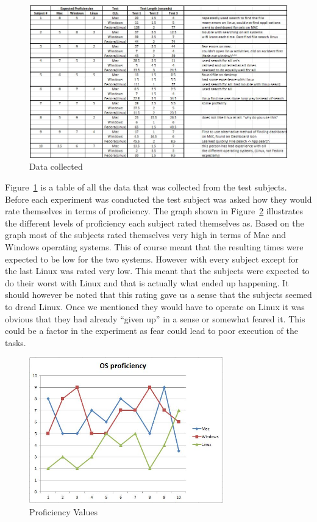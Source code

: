 \documentclass[11pt]{article}
\begin{document}
\begin{figure}[h!]
  \centering
    \includegraphics[width= 1\textwidth]{./Images/Data_table}
  \caption{Data collected}
 \label{Collect}
\end{figure}


Figure~\ref{Collect} is a table of all the data that was collected from the test subjects. Before each experiment was conducted the test subject was asked how they would rate themselves in terms of proficiency. The graph shown in Figure~\ref{Proficiency} illustrates the different levels of proficiency each subject rated themselves as. Based on the graph most of the subjects rated themselves very high in terms of Mac and Windows operating systems. This of course meant that the resulting times were expected to be low for the two systems. However with every subject except for the last Linux was rated very low. This meant that the subjects were expected to do their worst with Linux and that is actually what ended up happening. It should however be noted that this rating gave us a sense that the subjects seemed to dread Linux. Once we mentioned they would have to operate on Linux it was obvious that they had already ``given up'' in a sense or somewhat feared it. This could be a factor in the experiment as fear could lead to poor execution of the tasks.

\begin{figure}[h!]
  \centering
    \includegraphics[width=0.75\textwidth]{./Images/Proficiency}
  \caption{Proficiency Values}
 \label{Proficiency}
\end{figure}
\end{document}
